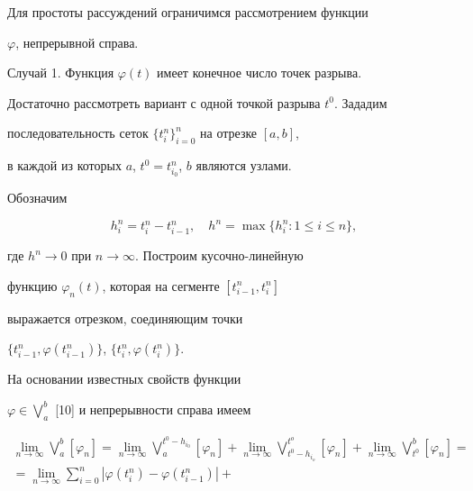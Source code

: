 \begin{pf}


Для простоты рассуждений ограничимся рассмотрением функции


$\varphi$, непрерывной справа.





Случай 1. Функция $\varphi(t)$ имеет конечное число точек разрыва.


Достаточно рассмотреть вариант с одной точкой разрыва $t^0$. Зададим


последовательность сеток $\{t^n_i\}_{i=0}^n$ на отрезке $[a,b]$,


в каждой из которых $a$, $t^0=t^n_{i_0}$, $b$ являются узлами.


Обозначим


$$


h^n_i = t^n_i - t^n_{i-1},\quad h^n = \max \{h^n_i : 1 \le i \le n\},


$$


где $h^n \to 0$ при $n \to \infty$. Построим кусочно-линейную


функцию $\varphi_n(t)$, которая на сегменте $[t^n_{i-1}, t^n_i]$


выражается отрезком, соединяющим точки


$\{ t^n_{i-1}, \varphi(t^n_{i-1}) \}$, $\{ t^n_{i},


\varphi(t^n_{i}) \}$.





На основании известных свойств функции


$\varphi\in \bigvee\limits_a^b $ [10] и непрерывности справа имеем


\begin{multline*}


\lim_{n \to \infty}


\bigvee\limits_a^b[ \varphi_n ] = \lim\limits_{n \to \infty}


\bigvee\limits_a^{t^0-h_{i_0}}[ \varphi_n ] +


\lim_{n \to \infty}


\bigvee\limits_{t^0-h_{i_o}}^{t^o}[ \varphi_n ] + 


\lim_{n \to \infty}\bigvee\limits_{t^0}^b[ \varphi_n ] = \\


%


=\lim_{n \to \infty}\sum_{i=0}^n


|\varphi(t^n_{i}) - \varphi(t^n_{i-1})| +



\end{multline*}
\end{pf}
